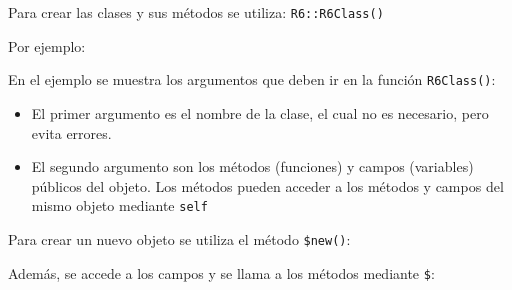 \documentclass[
]{book}
\newenvironment{Shaded}{\begin{snugshade}}{\end{snugshade}}
\newcommand{\AttributeTok}[1]{\textcolor[rgb]{0.13,0.29,0.53}{#1}}
\newcommand{\ControlFlowTok}[1]{\textcolor[rgb]{0.13,0.29,0.53}{\textbf{#1}}}
\newcommand{\DecValTok}[1]{\textcolor[rgb]{0.00,0.00,0.81}{#1}}
\newcommand{\DocumentationTok}[1]{\textcolor[rgb]{0.56,0.35,0.01}{\textbf{\textit{#1}}}}
\newcommand{\FunctionTok}[1]{\textcolor[rgb]{0.13,0.29,0.53}{\textbf{#1}}}
\newcommand{\NormalTok}[1]{#1}
\newcommand{\OtherTok}[1]{\textcolor[rgb]{0.56,0.35,0.01}{#1}}
\newcommand{\SpecialCharTok}[1]{\textcolor[rgb]{0.81,0.36,0.00}{\textbf{#1}}}
\newcommand{\StringTok}[1]{\textcolor[rgb]{0.31,0.60,0.02}{#1}}
\begin{document}
Para crear las clases y sus métodos se utiliza: \texttt{R6::R6Class()}

Por ejemplo:

\begin{Shaded}
\end{Shaded}

En el ejemplo se muestra los argumentos que deben ir en la función \texttt{R6Class()}:

\begin{itemize}
\item
  El primer argumento es el nombre de la clase, el cual no es necesario, pero evita errores.
\item
  El segundo argumento son los métodos (funciones) y campos (variables) públicos del objeto. Los métodos pueden acceder a los métodos y campos del mismo objeto mediante \texttt{self}
\end{itemize}

Para crear un nuevo objeto se utiliza el método \texttt{\$new()}:

\begin{Shaded}
\end{Shaded}

Además, se accede a los campos y se llama a los métodos mediante \texttt{\$}:

\begin{Shaded}
\end{Shaded}
\end{document}
